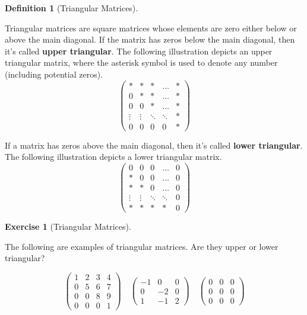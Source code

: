 \documentclass[
]{article}
\theoremstyle{definition}
\newtheorem{definition}{Definition}[section]
\theoremstyle{definition}
\theoremstyle{definition}
\newtheorem{exercise}{Exercise}[section]
\theoremstyle{definition}
\theoremstyle{remark}
\begin{document}
\begin{definition}[Triangular Matrices]
\protect\hypertarget{def:triangulardef}{}\label{def:triangulardef}

Triangular matrices are square matrices whose elements are zero either below or above the main diagonal. If the matrix has zeros below the main diagonal, then it's called \textbf{upper triangular}. The following illustration depicts an upper triangular matrix, where the asterisk symbol is used to denote any number (including potential zeros).
\[\left(\begin{matrix} *&*&*&\dots&*\\0&*&*&\dots&*\\0&0&*&\dots&*\\ \vdots &\vdots &\ddots &\ddots&*\\0&0&0&0&*\end{matrix}\right)\]

If a matrix has zeros above the main diagonal, then it's called \textbf{lower triangular}. The following illustration depicts a lower triangular matrix.
\[\left(\begin{matrix} 0&0&0&\dots&0\\ *&0&0&\dots&0\\ *&*&0&\dots&0\\ \vdots &\vdots &\ddots &\ddots&0\\ *&*&*&*&0\end{matrix}\right)\]

\end{definition}

\begin{exercise}[Triangular Matrices]
\protect\hypertarget{exr:triangularexer}{}\label{exr:triangularexer}

The following are examples of triangular matrices. Are they upper or lower triangular?

\[\left(\begin{matrix} 1&2&3&4\\0&5&6&7\\0&0&8&9\\0&0&0&1 \end{matrix}\right) \quad \left(\begin{matrix} -1&0&0\\0&-2&0\\1&-1&2 \end{matrix}\right) \quad \left(\begin{matrix} 0&0&0\\0&0&0\\0&0&0 \end{matrix}\right)\]

\end{exercise}
\end{document}
